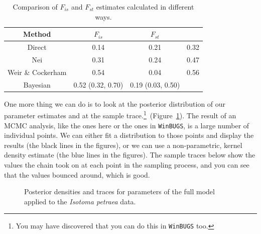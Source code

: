 \documentclass[12pt]{article}
\begin{document}
\begin{table}
\begin{center}
\begin{tabular}{c|ccc}
\hline\hline
Method & $F_{is}$ & $F_{st}$ \\
\hline
Direct            & 0.14 & 0.21 & 0.32 \\
Nei               & 0.31 & 0.24 & 0.47 \\
Weir \& Cockerham & 0.54 & 0.04 & 0.56 \\
Bayesian          & 0.52 (0.32, 0.70) & 0.19 (0.03, 0.50) \\
\hline
\end{tabular}
\end{center}
\caption{Comparison of $F_{is}$ and $F_{st}$ estimates calculated in
  different ways.}\label{table:compare}
\end{table}

One more thing we can do is to look at the posterior distribution of
our parameter estimates and at the sample trace.\footnote{You may have
  discovered that you can do this in {\tt WinBUGS}
  too.}~(Figure~\ref{fig:james}). The result of an MCMC analysis, like
the ones here or the ones in {\tt WinBUGS}, is a large number of
individual points. We can either fit a distribution to those points
and display the results (the black lines in the figures), or we can
use a non-parametric, kernel density estimate (the blue lines in the
figures). The sample traces below show the values the chain took on at
each point in the sampling process, and you can see that the values
bounced around, which is good.

\begin{figure}
\caption{Posterior densities and traces for parameters of the full
  model applied to the {\it Isotoma petraea} data.}\label{fig:james}
\end{figure}
\end{document}
